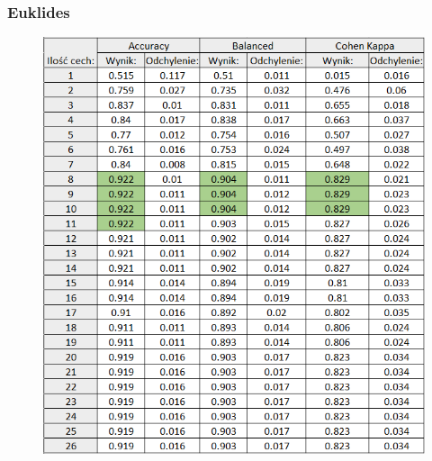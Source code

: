 \documentclass[12pt]{article}
\begin{document}
\subsubsection{Euklides}
\begin{figure}[H]
	\centering
	\label{metryki_euklides_norm_tab}
		\includegraphics[scale=0.9]{images/metrics/9nn_euklides_norm_tab.png}
\end{figure}
\end{document}
